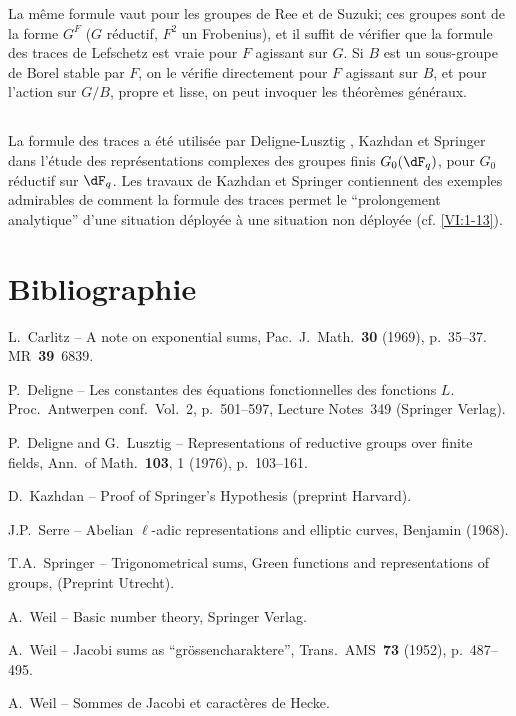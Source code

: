 La même formule vaut pour les groupes de Ree et de Suzuki; ces groupes sont 
de la forme $G^F$ ($G$ réductif, $F^2$ un Frobenius), et il suffit de 
vérifier que la formule des traces de Lefschetz est vraie pour $F$ agissant 
sur $G$. Si $B$ est un sous-groupe de Borel stable par $F$, on le vérifie 
directement pour $F$ agissant sur $B$, et pour l'action sur $G/B$, propre et 
lisse, on peut invoquer les théorèmes généraux. 





\subsection{}\label{VI:8-3}

La formule des traces a été utilisée par Deligne-Lusztig \cite{dl76}, 
Kazhdan \cite{ka77} et Springer \cite{sp76} dans l'étude des 
représentations complexes des groupes finis $G_0(\dF_q)$, pour $G_0$ 
réductif sur $\dF_q$. Les travaux de Kazhdan et Springer contiennent des 
exemples admirables de comment la formule des traces permet le ``prolongement 
analytique'' d'une situation déployée à une situation non déployée 
(cf. \ref{VI:1-13}). 







\section*{Bibliographie}
\begin{enumerate}[{[}1{]}]
\item L.~Carlitz -- A note on exponential sums, Pac.~J.~Math.~\textbf{30} (1969), p.~35--37. MR~\textbf{39}~6839.
\item P.~Deligne -- Les constantes des équations fonctionnelles des fonctions $L$.
Proc.~Antwerpen conf.~Vol.~2, p.~501--597, Lecture Notes~349 (Springer Verlag).
\item P.~Deligne and G.~Lusztig -- Representations of reductive groups over finite fields,
Ann.~of Math.~\textbf{103}, 1 (1976), p.~103--161.
\item D.~Kazhdan -- Proof of Springer's Hypothesis (preprint Harvard).
\item J.P.~Serre -- Abelian $\ell$-adic representations and elliptic curves, Benjamin (1968).
\item T.A.~Springer -- Trigonometrical sums, Green functions and representations of
 groups, (Preprint Utrecht).
\item A.~Weil -- Basic number theory, Springer Verlag.
\item A.~Weil -- Jacobi sums as ``gr\"ossencharaktere'', Trans.~AMS~\textbf{73} (1952), p.~487--495.
\item A.~Weil -- Sommes de Jacobi et caractères de Hecke.
\end{enumerate}
